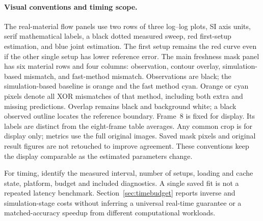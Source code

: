 \paragraph{Visual conventions and timing scope.}
The real-material flow panels use two rows of three log--log plots,
SI axis units, serif mathematical labels, a black dotted measured
sweep, red first-setup estimation, and blue joint estimation.
The first setup remains the red curve even if the other single
setup has lower reference error. The main freshness mask panel has
six material rows and four columns: observation, contour overlay,
simulation-based mismatch, and fast-method mismatch. Observations are
black; the simulation-based baseline is orange and the fast method
cyan. Orange or cyan pixels denote all XOR mismatches of that method,
including both extra and missing predictions. Overlap remains black
and background white; a black observed outline locates the reference
boundary. Frame~8 is fixed for display. Its labels are distinct from
the eight-frame table averages.
Any common crop is for display only; metrics use the full original
images. Saved mask pixels and original result figures are not
retouched to improve agreement. These conventions keep the display
comparable as the estimated parameters change.

For timing, identify the measured interval, number of setups,
loading and cache state, platform, budget and included diagnostics.
A single saved fit is not a repeated latency benchmark.
Section~\ref{sec:timebudget} reports inverse and simulation-stage
costs without inferring a universal real-time guarantee or a
matched-accuracy speedup from different computational workloads.


